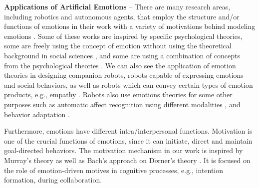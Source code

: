 \textbf{Applications of Artificial Emotions} -- There are many research areas,
including robotics and autonomous agents, that employ the structure and/or
functions of emotions in their work with a variety of motivations behind
modeling emotions \cite{wehrle:motivations-modeling-emotion}. Some of these
works are inspired by specific psychological theories, some are freely using the
concept of emotion without using the theoretical background in social sciences
\cite{urban:pecs}, and some are using a combination of concepts from the
psychological theories \cite{kiryazov:modeling-appraisal-pad}. We can also see
the application of emotion theories in designing companion robots, robots
capable of expressing emotions and social behaviors, as well as robots which can
convey certain types of emotion products, e.g., empathy
\cite{breazeal:expressive-behavior,paiva:emotion-modeling,shayganfar:methodology}.
Robots also use emotions theories for some other purposes such as automatic
affect recognition using different modalities \cite{zeng:affect-recognition},
and behavior adaptation \cite{liu:affect-robot-behavior}.

Furthermore, emotions have different intra/interpersonal functions. Motivation
is one of the crucial functions of emotions, since it can initiate, direct and
maintain goal-directed behaviors. The motivation mechanism in our work is
inspired by Murray's theory as well as Bach's approach on D$\ddot{o}$rner's
theory
\cite{bach:micropsi-agent-architecture,bach:psi,bach:motivaitional-system-ai,bach:next-generation-micropsi}.
It is focused on the role of emotion-driven motives in cognitive processes,
e.g., intention formation, during collaboration.\\

